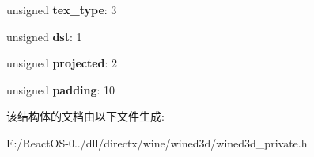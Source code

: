 \begin{DoxyCompactItemize}
\item 
\mbox{\label{structtexture__stage__op_a1ef7da99eb759798c6c96c15b9d84d18}} 
unsigned {\bfseries tex\+\_\+type}\+: 3
\item 
\mbox{\label{structtexture__stage__op_a66ea78ece64f014620d88d19166c5d9f}} 
unsigned {\bfseries dst}\+: 1
\item 
\mbox{\label{structtexture__stage__op_ad1c183e7dba4ac507af509313d608d27}} 
unsigned {\bfseries projected}\+: 2
\item 
\mbox{\label{structtexture__stage__op_aa06c2d384702c02c1320a934f2678b2f}} 
unsigned {\bfseries padding}\+: 10
\end{DoxyCompactItemize}


该结构体的文档由以下文件生成\+:\begin{DoxyCompactItemize}
\item 
E\+:/\+React\+O\+S-\/0../dll/directx/wine/wined3d/wined3d\+\_\+private.\+h\end{DoxyCompactItemize}
